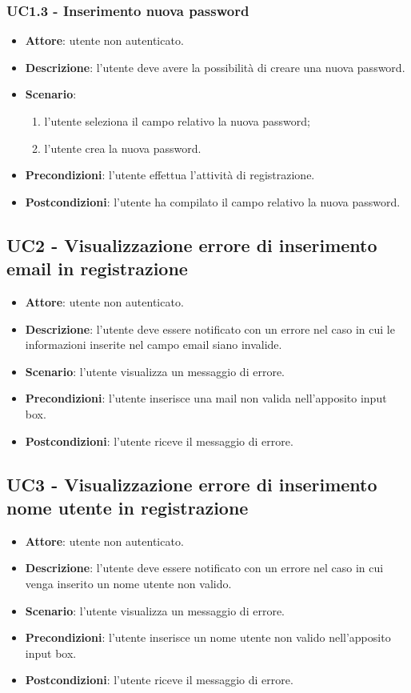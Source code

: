 \subsubsection{UC1.3 - Inserimento nuova password}
\begin{itemize}
    \item \textbf{Attore}: utente non autenticato.
    \item \textbf{Descrizione}: l'utente deve avere la possibilità di creare una nuova password.
    \item \textbf{Scenario}:
    \begin{enumerate}
        \item l'utente seleziona il campo relativo la nuova password;
        \item l'utente crea la nuova password.
    \end{enumerate}

    \item \textbf{Precondizioni}: l'utente effettua l'attività di registrazione.
    \item \textbf{Postcondizioni}: l'utente ha compilato il campo relativo la nuova password.
\end{itemize}

\subsection{UC2 - Visualizzazione errore di inserimento email in registrazione}
\begin{itemize}
    \item \textbf{Attore}: utente non autenticato.
    \item \textbf{Descrizione}: l'utente deve essere notificato con un errore nel caso in cui le informazioni inserite nel campo email siano invalide.
    \item \textbf{Scenario}: l'utente visualizza un messaggio di errore.
    \item \textbf{Precondizioni}: l'utente inserisce una mail non valida nell'apposito input box.
    \item \textbf{Postcondizioni}: l'utente riceve il messaggio di errore.
\end{itemize}

\subsection{UC3 - Visualizzazione errore di inserimento nome utente in registrazione}
\begin{itemize}
    \item \textbf{Attore}: utente non autenticato.
    \item \textbf{Descrizione}: l'utente deve essere notificato con un errore nel caso in cui venga inserito un nome utente non valido.
    \item \textbf{Scenario}: l'utente visualizza un messaggio di errore.
    \item \textbf{Precondizioni}: l'utente inserisce un nome utente non valido nell'apposito input box.
    \item \textbf{Postcondizioni}: l'utente riceve il messaggio di errore.
\end{itemize}

